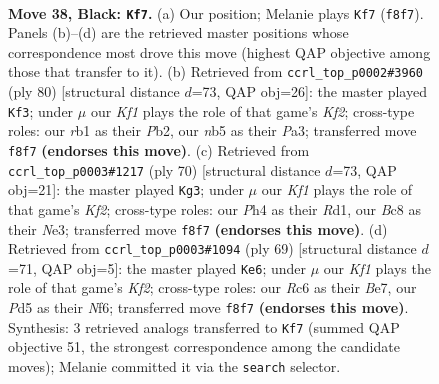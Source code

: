 \documentclass[11pt]{article}
\begin{document}
\clearpage

\begin{figure}[p]\centering
\begin{subfigure}{0.46\textwidth}\centering
\resizebox{\linewidth}{!}{%
\newchessgame
\chessboard[
  setfen={1nb2k2/1p6/1nr2p2/pN1p2p1/1b4Pp/1P2P2P/PB2PK2/1R1B4 b - - 11 38},
  showmover=false,
  pgfstyle=straightmove, color=movearrow, markmove={f8-f7}
]}
\caption{}
\end{subfigure}\hfill
\begin{subfigure}{0.46\textwidth}\centering
\resizebox{\linewidth}{!}{%
\newchessgame
\chessboard[
  setfen={6k1/rpb2p2/2p1n1p1/p1P4p/N3P3/PR2B1PP/1P3K2/8 w - - 5 41},
  showmover=false,
  pgfstyle=straightmove, color=movearrow, markmove={f2-f3}
]}
\caption{}
\end{subfigure}
\\[4pt]
\begin{subfigure}{0.46\textwidth}\centering
\resizebox{\linewidth}{!}{%
\newchessgame
\chessboard[
  setfen={1r6/n4p2/1p1kb2p/p2p2pP/3P2P1/P3NP2/1PB2K2/3R4 w - - 1 36},
  showmover=false,
  pgfstyle=straightmove, color=movearrow, markmove={f2-g3}
]}
\caption{}
\end{subfigure}\hfill
\begin{subfigure}{0.46\textwidth}\centering
\resizebox{\linewidth}{!}{%
\newchessgame
\chessboard[
  setfen={8/1p1rbk2/p4np1/3pBp1p/3P3P/P2K1PP1/1PR3B1/8 b - - 1 35},
  showmover=false,
  pgfstyle=straightmove, color=movearrow, markmove={f7-e6}
]}
\caption{}
\end{subfigure}
\caption{\textbf{Move 38, Black: \texttt{Kf7}.} (a) Our position; Melanie plays \texttt{Kf7} (\texttt{f8f7}). Panels (b)--(d) are the retrieved master positions whose correspondence most drove this move (highest QAP objective among those that transfer to it). (b) Retrieved from \texttt{ccrl\_top\_p0002\#3960} (ply 80) [structural distance $d$=73, QAP obj=26]: the master played \texttt{Kf3}; under $\mu$ our \emph{Kf1} plays the role of that game's \emph{Kf2}; cross-type roles: our \emph{r}b1 as their \emph{P}b2, our \emph{n}b5 as their \emph{P}a3; transferred move \texttt{f8f7} \textbf{(endorses this move)}. (c) Retrieved from \texttt{ccrl\_top\_p0003\#1217} (ply 70) [structural distance $d$=73, QAP obj=21]: the master played \texttt{Kg3}; under $\mu$ our \emph{Kf1} plays the role of that game's \emph{Kf2}; cross-type roles: our \emph{P}h4 as their \emph{R}d1, our \emph{B}c8 as their \emph{N}e3; transferred move \texttt{f8f7} \textbf{(endorses this move)}. (d) Retrieved from \texttt{ccrl\_top\_p0003\#1094} (ply 69) [structural distance $d$=71, QAP obj=5]: the master played \texttt{Ke6}; under $\mu$ our \emph{Kf1} plays the role of that game's \emph{Kf2}; cross-type roles: our \emph{R}c6 as their \emph{B}e7, our \emph{P}d5 as their \emph{N}f6; transferred move \texttt{f8f7} \textbf{(endorses this move)}. Synthesis: 3 retrieved analogs transferred to \texttt{Kf7} (summed QAP objective 51, the strongest correspondence among the candidate moves); Melanie committed it via the \texttt{search} selector.}
\label{fig:thought-m75}
\end{figure}
\end{document}
